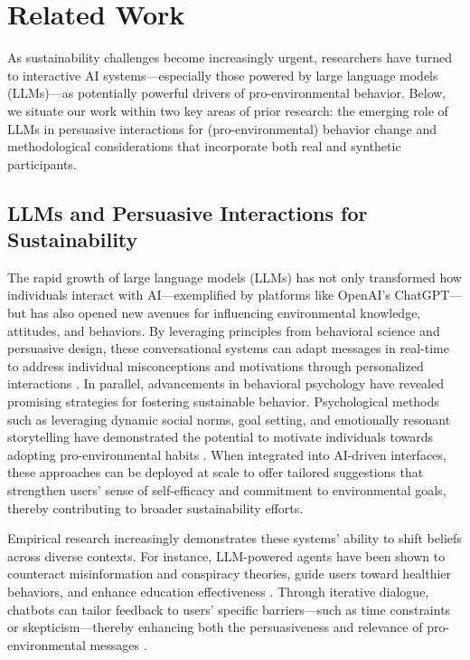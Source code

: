 \section{Related Work}
As sustainability challenges become increasingly urgent, researchers have turned to interactive AI systems—especially those powered by large language models (LLMs)—as potentially powerful drivers of pro-environmental behavior. Below, we situate our work within two key areas of prior research: the emerging role of LLMs in persuasive interactions for (pro-environmental) behavior change and methodological considerations that incorporate both real and synthetic participants.

\subsection{LLMs and Persuasive Interactions for Sustainability}
The rapid growth of large language models (LLMs) has not only transformed how individuals interact with AI—exemplified by platforms like OpenAI’s ChatGPT—but has also opened new avenues for influencing environmental knowledge, attitudes, and behaviors. By leveraging principles from behavioral science and persuasive design, these conversational systems can adapt messages in real-time to address individual misconceptions and motivations through personalized interactions \cite{Fogg2003, Giudici2024, Giudici2024b}. In parallel, advancements in behavioral psychology have revealed promising strategies for fostering sustainable behavior. Psychological methods such as leveraging dynamic social norms, goal setting, and emotionally resonant storytelling have demonstrated the potential to motivate individuals towards adopting pro-environmental habits \cite{Breiter2024, Vlasceanu2024, Gifford2011a, Aavik2022UsingChoices}. When integrated into AI-driven interfaces, these approaches can be deployed at scale to offer tailored suggestions that strengthen users’ sense of self-efficacy and commitment to environmental goals, thereby contributing to broader sustainability efforts.

Empirical research increasingly demonstrates these systems’ ability to shift beliefs across diverse contexts. For instance, LLM-powered agents have been shown to counteract misinformation and conspiracy theories, guide users toward healthier behaviors, and enhance education effectiveness \cite{Wang2023, Aggarwal2023, Costello2024}. Through iterative dialogue, chatbots can tailor feedback to users’ specific barriers—such as time constraints or skepticism—thereby enhancing both the persuasiveness and relevance of pro-environmental messages \cite{Aggarwal2023, Giudici2024b}. 

